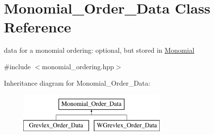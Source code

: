 \hypertarget{class_monomial___order___data}{}\section{Monomial\+\_\+\+Order\+\_\+\+Data Class Reference}
\label{class_monomial___order___data}


data for a monomial ordering\+: optional, but stored in {\ttfamily \hyperlink{class_monomial}{Monomial}}  




{\ttfamily \#include $<$monomial\+\_\+ordering.\+hpp$>$}

Inheritance diagram for Monomial\+\_\+\+Order\+\_\+\+Data\+:\begin{figure}[H]
\begin{center}
\leavevmode
\includegraphics[height=2.000000cm]{class_monomial___order___data}
\end{center}
\end{figure}
